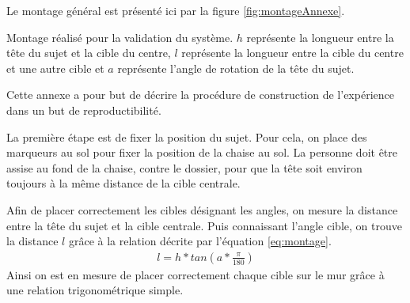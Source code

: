 \documentclass[letterpaper, twoside, 12pt, memoire, creativecommons, hyperref]{thETS}
\begin{document}
Le montage général est présenté ici par la figure \ref{fig:montageAnnexe}.

\begin{figureap}[ht]
	\centering
	\caption{Montage réalisé pour la validation du système. $h$ représente la longueur entre la tête du sujet et la cible du centre, $l$ représente la longueur entre la cible du centre et une autre cible et $a$ représente l'angle de rotation de la tête du sujet.}
	\label{fig:montageAnnexe}
\end{figureap}

Cette annexe a pour but de décrire la procédure de construction de l'expérience dans un but de reproductibilité. 

La première étape est de fixer la position du sujet. Pour cela, on place des marqueurs au sol pour fixer la position de la chaise au sol. La personne doit être assise au fond de la chaise, contre le dossier, pour que la tête soit environ toujours à la même distance de la cible centrale. 

Afin de placer correctement les cibles désignant les angles, on mesure la distance entre la tête du sujet et la cible centrale. Puis connaissant l'angle cible, on trouve la distance $l$ grâce à la relation décrite par l'équation \ref{eq:montage}.
\begin{align}\label{eq:montage}
   l = h*tan(a*\frac{\pi}{180} )
\end{align}
Ainsi on est en mesure de placer correctement chaque cible sur le mur grâce à une relation trigonométrique simple.

%
\end{document}
